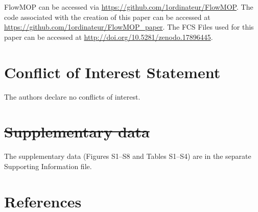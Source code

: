\documentclass[ASNA]{latex/wiley/USG}
\begin{document}
FlowMOP can be accessed via
\url{https://github.com/1ordinateur/FlowMOP}. The code associated with
the creation of this paper can be accessed at
\url{https://github.com/1ordinateur/FlowMOP_paper}. The FCS Files used
for this paper can be accessed at
\url{http://doi.org/10.5281/zenodo.17896445}.

\FloatBarrier

\section{\texorpdfstring{{\color{revisionblue}Conflict of Interest
Statement}}{Conflict of Interest Statement}}\label{conflict-of-interest-statement}

{\color{revisionblue}The authors declare no conflicts of interest.}

\FloatBarrier

\clearpage

\section{\texorpdfstring{{\color{revisionred}\sout{Supplementary
data}}}{Supplementary data}}\label{supplementary-data}

{\color{revisionblue}The supplementary data (Figures S1--S8 and Tables
S1--S4) are in the separate Supporting Information file.}

\FloatBarrier

\clearpage

\section{References}\label{references}
\end{document}
